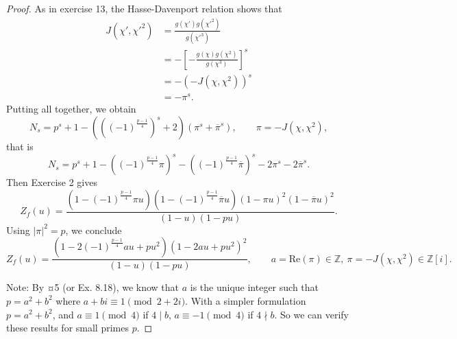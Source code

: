 \documentclass[11pt,a4paper]{article}
\newcommand{\Z}{\mathbb{Z}}
\begin{document}
\begin{proof}
As in exercise 13, the Hasse-Davenport relation shows that
\begin{align*}
J(\chi',\chi'^2) &= \frac{g(\chi') g(\chi'^2)}{g(\chi'^3)}\\
&= - \left[- \frac{ g(\chi) g(\chi^2)}{g(\chi^3)}\right]^s\\
&= - (-J(\chi,\chi^2))^s\\
&= -\pi^s.
\end{align*}
Putting all together, we obtain
$$N_s = p^s +1 - (((-1)^{\frac{p-1}{4}})^s+ 2) (\pi^s + \overline{\pi}^s),\qquad \pi = -J(\chi,\chi^2),$$
that is
$$N_s = p^s + 1  - ((-1)^{\frac{p-1}{4}} \pi)^s -((-1)^{\frac{p-1}{4}} \overline{\pi})^s -2 \pi^s - 2 \overline{\pi}^s.$$
Then Exercise 2 gives
$$Z_f(u) = \frac{(1 - (-1)^\frac{p-1}{4} \pi u)(1 - (-1)^\frac{p-1}{4} \overline{\pi} u)(1 - \pi u)^2(1- \overline{\pi}u)^2}{(1-u)(1-pu)}.$$
Using $|\pi|^2 = p$, we conclude
$$Z_f(u) = \frac{(1 - 2(-1)^\frac{p-1}{4} a u + p u^2)(1 -2au + pu^2)^2}{(1-u)(1-pu)}, \qquad a = \mathrm{Re}(\pi) \in \Z,\ \pi = -J(\chi,\chi^2) \in \Z[i].$$

Note: By ¤5  (or Ex. 8.18), we know that $a$ is the unique integer such that $p=a^2+b^2$ where $a+bi \equiv 1 \pmod{2+2i}$. With a simpler formulation $p = a^2 + b^2$, and $a \equiv 1 \pmod 4$ if $4 \mid b$, $a \equiv -1 \pmod 4$ if $4 \nmid b$. So we can verify these results for small primes $p$.
\end{proof}
\end{document}
